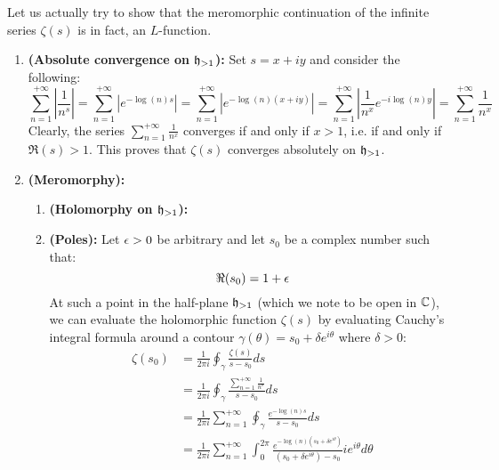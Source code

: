 \begin{example}
\begin{enumerate}
                    Let us actually try to show that the meromorphic continuation of the infinite series $\zeta(s)$ is in fact, an $L$-function.
                        \begin{enumerate}
                            \item \textbf{(Absolute convergence on $\h_{> 1}$):} Set $s = x + iy$ and consider the following:
                                $$\sum_{n = 1}^{+\infty} \left|\frac{1}{n^s}\right| = \sum_{n = 1}^{+\infty} |e^{- \log(n) s}| = \sum_{n = 1}^{+\infty} |e^{- \log(n) (x + iy)}|  = \sum_{n = 1}^{+\infty} \left|\frac{1}{n^x} e^{- i \log(n) y}\right| = \sum_{n = 1}^{+\infty} \frac{1}{n^x}$$
                            Clearly, the series $\sum_{n = 1}^{+\infty} \frac{1}{n^x}$ converges if and only if $x > 1$, i.e. if and only if $\Re(s) > 1$. This proves that $\zeta(s)$ converges absolutely on $\h_{> 1}$.
                            \item \textbf{(Meromorphy):}
                                \begin{enumerate}
                                    \item \textbf{(Holomorphy on $\h_{> 1}$):}
                                    \item \textbf{(Poles):} Let $\e > 0$ be arbitrary and let $s_0$ be a complex number such that:
                                        $$\Re(s_0) = 1 + \e$$
                                    At such a point in the half-plane $\h_{> 1}$ (which we note to be open in $\bbC$), we can evaluate the holomorphic function $\zeta(s)$ by evaluating Cauchy's integral formula around a contour $\gamma(\theta) = s_0 + \delta e^{i\theta}$ where $\delta > 0$:
                                        $$
                                            \begin{aligned}
                                                \zeta(s_0) & = \frac{1}{2\pi i} \oint_{\gamma} \frac{\zeta(s)}{s - s_0} ds
                                                \\
                                                & = \frac{1}{2\pi i} \oint_{\gamma} \frac{\sum_{n = 1}^{+\infty} \frac{1}{n^s}}{s - s_0} ds
                                                \\
                                                & = \frac{1}{2\pi i} \sum_{n = 1}^{+\infty} \oint_{\gamma} \frac{e^{- \log(n) s}}{s - s_0} ds
                                                \\
                                                & = \frac{1}{2\pi i} \sum_{n = 1}^{+\infty} \int_0^{2\pi} \frac{e^{-\log(n) (s_0 + \delta e^{i\theta})}}{(s_0 + \delta e^{i\theta}) - s_0} ie^{i\theta} d\theta 

\end{aligned}$$
\end{enumerate}
\end{enumerate}
\end{enumerate}
\end{example}
